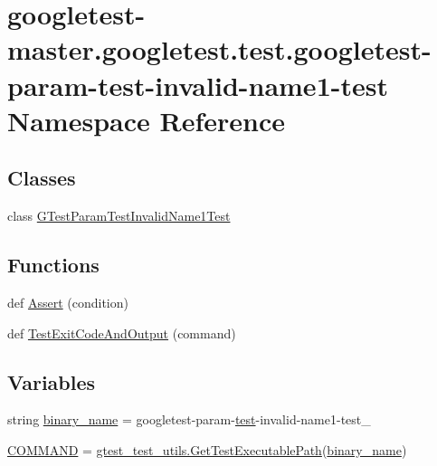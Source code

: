 \hypertarget{namespacegoogletest-master_1_1googletest_1_1test_1_1googletest-param-test-invalid-name1-test}{}\section{googletest-\/master.googletest.\+test.\+googletest-\/param-\/test-\/invalid-\/name1-\/test Namespace Reference}
\label{namespacegoogletest-master_1_1googletest_1_1test_1_1googletest-param-test-invalid-name1-test}
\subsection*{Classes}
\begin{DoxyCompactItemize}
\item 
class \mbox{\hyperlink{classgoogletest-master_1_1googletest_1_1test_1_1googletest-param-test-invalid-name1-test_1_1_g_tf880334fd9d35194c26b114edbd24da2}{G\+Test\+Param\+Test\+Invalid\+Name1\+Test}}
\end{DoxyCompactItemize}
\subsection*{Functions}
\begin{DoxyCompactItemize}
\item 
def \mbox{\hyperlink{namespacegoogletest-master_1_1googletest_1_1test_1_1googletest-param-test-invalid-name1-test_aa119907f7d75161d3a22c00ccc0e2386}{Assert}} (condition)
\item 
def \mbox{\hyperlink{namespacegoogletest-master_1_1googletest_1_1test_1_1googletest-param-test-invalid-name1-test_a480ff8744eca4b3451008e41e00a4cf3}{Test\+Exit\+Code\+And\+Output}} (command)
\end{DoxyCompactItemize}
\subsection*{Variables}
\begin{DoxyCompactItemize}
\item 
string \mbox{\hyperlink{namespacegoogletest-master_1_1googletest_1_1test_1_1googletest-param-test-invalid-name1-test_a96c453764fc603af54ac5e4361cde904}{binary\+\_\+name}} = \textquotesingle{}googletest-\/param-\/\mbox{\hyperlink{_mutual_8h_a707ee03719e99670bf6cfdfd897b8456}{test}}-\/invalid-\/name1-\/test\+\_\+\textquotesingle{}
\item 
\mbox{\hyperlink{namespacegoogletest-master_1_1googletest_1_1test_1_1googletest-param-test-invalid-name1-test_a4e4bcb8d4a33cff12fb8b3b99ce69f5d}{C\+O\+M\+M\+A\+ND}} = \mbox{\hyperlink{namespacegoogletest-master_1_1googletest_1_1test_1_1gtest__test__utils_a78bbc69ac699e750a6a29188caa643c4}{gtest\+\_\+test\+\_\+utils.\+Get\+Test\+Executable\+Path}}(\mbox{\hyperlink{namespacegoogletest-master_1_1googletest_1_1test_1_1googletest-param-test-invalid-name1-test_a96c453764fc603af54ac5e4361cde904}{binary\+\_\+name}})
\end{DoxyCompactItemize}


